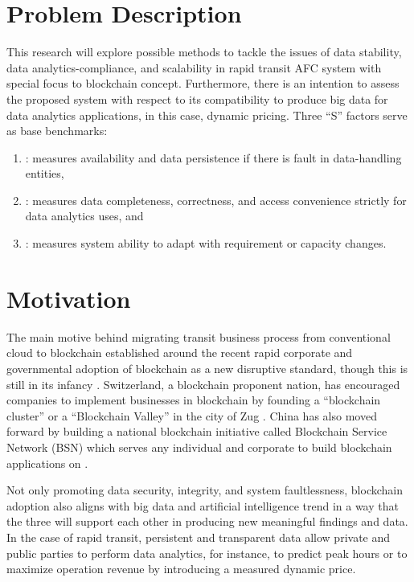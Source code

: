 \documentclass[a4paper,12pt,oneside, utf8x]{report}
\begin{document}
\section{Problem Description}
\label{sprobdesc}
This research will explore possible methods to tackle the issues of data stability, data analytics-compliance, and scalability in rapid transit AFC system with special focus to blockchain concept. Furthermore, there is an intention to assess the proposed system with respect to its compatibility to produce big data for data analytics applications, in this case, dynamic pricing. Three “S” factors serve as base benchmarks:
\begin{enumerate}
\item {}: measures availability and data persistence if there is fault in data-handling entities,
\item {}: measures data completeness, correctness, and access convenience strictly for data analytics uses, and
\item {}: measures system ability to adapt with requirement or capacity changes.
\end{enumerate}

\section{Motivation}
\label{smotiv}
The main motive behind migrating transit business process from conventional cloud to blockchain established around the recent rapid corporate and governmental adoption of blockchain as a new disruptive standard, though this is still in its infancy \cite{a9}. Switzerland, a blockchain proponent nation, has encouraged companies to implement businesses in blockchain by founding a “blockchain cluster” or a “Blockchain Valley” in the city of Zug \cite{a10}. China has also moved forward by building a national blockchain initiative called Blockchain Service Network (BSN) which serves any individual and corporate to build blockchain applications on \cite{a8}.

Not only promoting data security, integrity, and system faultlessness, blockchain adoption also aligns with big data and artificial intelligence trend in a way that the three will support each other in producing new meaningful findings and data. In the case of rapid transit, persistent and transparent data allow private and public parties to perform data analytics, for instance, to predict peak hours or to maximize operation revenue by introducing a measured dynamic price. 
\end{document}
